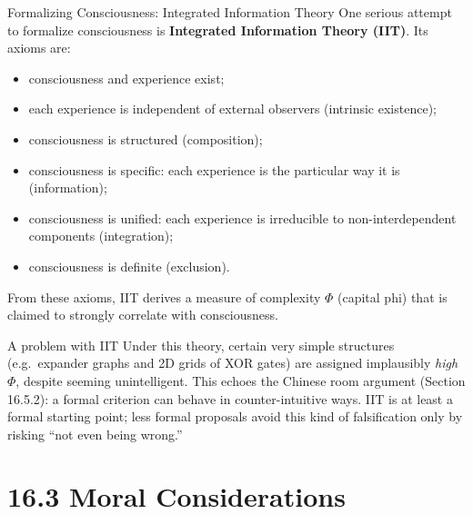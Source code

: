 \documentclass[aspectratio=169,10pt]{beamer}
\begin{document}
\begin{frame}{Formalizing Consciousness: Integrated Information Theory}
  One serious attempt to formalize consciousness is \textbf{Integrated
  Information Theory (IIT)}. Its axioms are:
  \begin{itemize}
    \item consciousness and experience exist;
    \item each experience is independent of external observers (intrinsic
      existence);
    \item consciousness is structured (composition);
    \item consciousness is specific: each experience is the particular way
      it is (information);
    \item consciousness is unified: each experience is irreducible to
      non-interdependent components (integration);
    \item consciousness is definite (exclusion).
  \end{itemize}
  From these axioms, IIT derives a measure of complexity $\Phi$ (capital
  phi) that is claimed to strongly correlate with consciousness.

  \begin{block}{A problem with IIT}
    Under this theory, certain very simple structures (e.g.\ expander
    graphs and 2D grids of XOR gates) are assigned implausibly \emph{high}
    $\Phi$, despite seeming unintelligent. This echoes the Chinese room
    argument (Section 16.5.2): a formal criterion can behave in
    counter-intuitive ways. IIT is at least a formal starting point; less
    formal proposals avoid this kind of falsification only by risking
    ``not even being wrong.''
  \end{block}
\end{frame}

\section{16.3 Moral Considerations}
\end{document}
